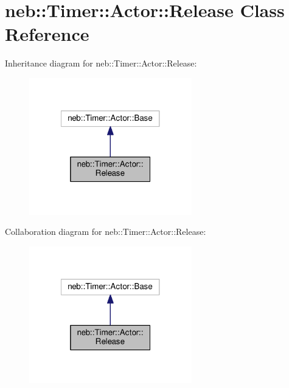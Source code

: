 \hypertarget{classneb_1_1Timer_1_1Actor_1_1Release}{\section{neb\-:\-:Timer\-:\-:Actor\-:\-:Release Class Reference}
\label{classneb_1_1Timer_1_1Actor_1_1Release}
}


Inheritance diagram for neb\-:\-:Timer\-:\-:Actor\-:\-:Release\-:\nopagebreak
\begin{figure}[H]
\begin{center}
\leavevmode
\includegraphics[width=200pt]{classneb_1_1Timer_1_1Actor_1_1Release__inherit__graph}
\end{center}
\end{figure}


Collaboration diagram for neb\-:\-:Timer\-:\-:Actor\-:\-:Release\-:\nopagebreak
\begin{figure}[H]
\begin{center}
\leavevmode
\includegraphics[width=200pt]{classneb_1_1Timer_1_1Actor_1_1Release__coll__graph}
\end{center}
\end{figure}

